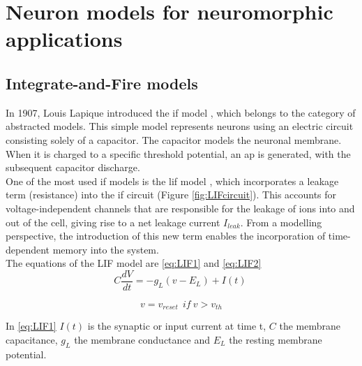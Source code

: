 \section{Neuron models for neuromorphic applications}
\subsection{Integrate-and-Fire models}
In 1907, Louis Lapique introduced the \acrfull{if} model \cite{Abbott1999,Tuckwell}, which belongs to the category of abstracted models. This simple model represents neurons using an electric circuit consisting solely of a capacitor. The capacitor models the neuronal membrane. When it is charged to a specific threshold potential, an \acrshort{ap} is generated, with the subsequent capacitor discharge.\\
One of the most used \acrshort{if} models is the \acrfull{lif} model \cite{Burkitt}, which incorporates a leakage term (resistance) into the \acrshort{if} circuit (Figure \ref{fig:LIFcircuit}). This accounts for voltage-independent channels that are responsible for the leakage of ions into and out of the cell, giving rise to a net leakage current $I_{leak}$. From a modelling perspective, the introduction of this new term enables the incorporation of time-dependent memory into the system.\\

The equations of the LIF model are \ref{eq:LIF1} and \ref{eq:LIF2}\\
\begin{equation}
    C\frac{dV}{dt}=-g_{L}\left(v-E_{L}\right)+I(t)\
    \label{eq:LIF1}
    \end{equation}

\begin{equation}
    v=v_{reset}\ \ if\ v>v_{th}
    \label{eq:LIF2}
    \end{equation}

In \ref{eq:LIF1} \(I(t)\) is the synaptic or input current at time t,
\(C\) the membrane capacitance,
\(g_{L}\) the membrane conductance and
\(E_{L}\) the resting membrane potential.\\

